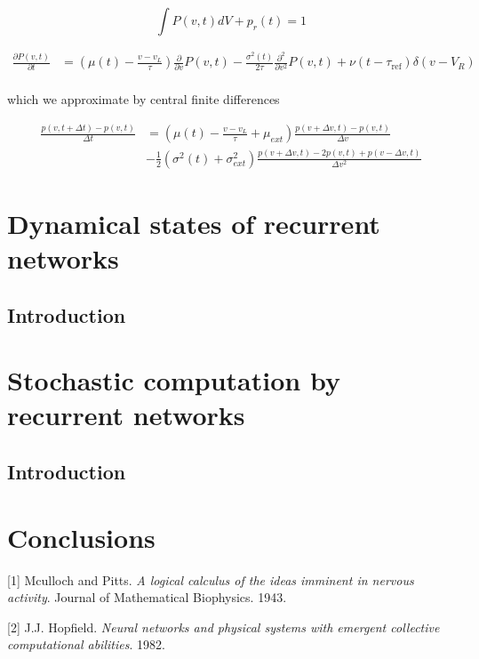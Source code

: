 \documentclass{ucetd}
\begin{document}
\begin{equation*}
\int P(v,t)dV + p_{r}(t) = 1
\end{equation*}

\begin{align*}
\frac{\partial P(v,t)}{\partial t} &= \left(\mu(t) - \frac{v-v_{L}}{\tau}\right) \frac{\partial}{\partial v} P(v,t) - \frac{\sigma^{2}(t)}{2\tau}\frac{\partial^{2}}{\partial v^{2}} P(v,t) + \nu(t-\tau_{\mathrm{ref}})\delta(v-V_{R})\\
\end{align*} 


which we approximate by central finite differences

\begin{align*}
\frac{p(v, t+\Delta t) - p(v,t)}{\Delta t} &= \left(\mu(t) - \frac{v-v_{L}}{\tau}+ \mu_{ext}\right)\frac{p(v+\Delta v, t) - p(v,t)}{\Delta v} \\
&- \frac{1}{2}\left(\sigma^{2}(t) + \sigma_{ext}^{2}\right)\frac{p(v+\Delta v, t) - 2p(v,t) + p(v-\Delta v, t)}{\Delta v^{2}}
\end{align*} 


\chapter{Dynamical states of recurrent networks}
\section{Introduction}


\chapter{Stochastic computation by recurrent networks}
\section{Introduction}

\chapter{Conclusions}


\makebibliography

[1] Mculloch and Pitts. \textit{A logical calculus of the ideas imminent in nervous activity}. Journal of Mathematical Biophysics. 1943.

[2] J.J. Hopfield. \textit{Neural networks and physical systems with emergent collective computational abilities}. 1982.
\end{document}

